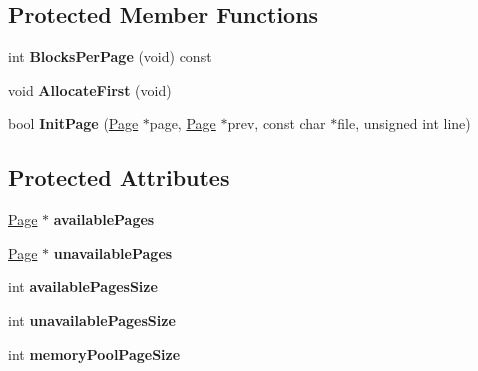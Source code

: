 \subsection*{Protected Member Functions}
\begin{DoxyCompactItemize}
\item 
\hypertarget{class_data_structures_1_1_memory_pool_ab7f08431d4592c9875de7d77ad02c065}{int {\bfseries Blocks\-Per\-Page} (void) const }\label{class_data_structures_1_1_memory_pool_ab7f08431d4592c9875de7d77ad02c065}

\item 
\hypertarget{class_data_structures_1_1_memory_pool_a15838f9c4443b6ee2178bb97043ff84c}{void {\bfseries Allocate\-First} (void)}\label{class_data_structures_1_1_memory_pool_a15838f9c4443b6ee2178bb97043ff84c}

\item 
\hypertarget{class_data_structures_1_1_memory_pool_af69b338e891e9e7d09f004e500650a51}{bool {\bfseries Init\-Page} (\hyperlink{struct_data_structures_1_1_memory_pool_1_1_page}{Page} $\ast$page, \hyperlink{struct_data_structures_1_1_memory_pool_1_1_page}{Page} $\ast$prev, const char $\ast$file, unsigned int line)}\label{class_data_structures_1_1_memory_pool_af69b338e891e9e7d09f004e500650a51}

\end{DoxyCompactItemize}
\subsection*{Protected Attributes}
\begin{DoxyCompactItemize}
\item 
\hypertarget{class_data_structures_1_1_memory_pool_ad38f6417c16f65fbc81e4d0d7681040e}{\hyperlink{struct_data_structures_1_1_memory_pool_1_1_page}{Page} $\ast$ {\bfseries available\-Pages}}\label{class_data_structures_1_1_memory_pool_ad38f6417c16f65fbc81e4d0d7681040e}

\item 
\hypertarget{class_data_structures_1_1_memory_pool_a87438f0e1167ce3375cb8c0ccfb623cc}{\hyperlink{struct_data_structures_1_1_memory_pool_1_1_page}{Page} $\ast$ {\bfseries unavailable\-Pages}}\label{class_data_structures_1_1_memory_pool_a87438f0e1167ce3375cb8c0ccfb623cc}

\item 
\hypertarget{class_data_structures_1_1_memory_pool_aaba4098e633674124f228068953d5c24}{int {\bfseries available\-Pages\-Size}}\label{class_data_structures_1_1_memory_pool_aaba4098e633674124f228068953d5c24}

\item 
\hypertarget{class_data_structures_1_1_memory_pool_a3958169c1e65b3d8e0f3be77eb43b319}{int {\bfseries unavailable\-Pages\-Size}}\label{class_data_structures_1_1_memory_pool_a3958169c1e65b3d8e0f3be77eb43b319}

\item 
\hypertarget{class_data_structures_1_1_memory_pool_a4a772c07d4bfad9f462ddf73b2a64b89}{int {\bfseries memory\-Pool\-Page\-Size}}\label{class_data_structures_1_1_memory_pool_a4a772c07d4bfad9f462ddf73b2a64b89}

\end{DoxyCompactItemize}


